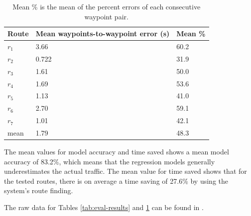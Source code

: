 \begin{table}[H]
	\centering
	\begin{tabular}{lll}
		\textbf{Route} & \textbf{Mean waypoints-to-waypoint error (s)}    & \textbf{Mean \%} \\ \hline
		$r_1$          & 3.66                                             & 60.2 \\
		$r_2$          & 0.722                                            & 31.9 \\
		$r_3$          & 1.61                                             & 50.0 \\
		$r_4$          & 1.69                                             & 53.6 \\
		$r_5$          & 1.13                                             & 41.0 \\
		$r_6$          & 2.70                                             & 59.1 \\
		$r_7$          & 1.01                                             & 42.1 \\ \hline
		mean           & 1.79                                             & 48.3
	\end{tabular}
	\caption{Mean \% is the mean of the percent errors of each consecutive waypoint pair.}
	\label{tab:eval-results-2}
\end{table}

The mean values for model accuracy and time saved shows a mean model accuracy of 83.2\%, which means that the regression models generally underestimates the actual traffic. The mean value for time saved shows that for the tested routes, there is on average a time saving of 27.6\% by using the system's route finding.

The raw data for Tables \ref{tab:eval-results} and \ref{tab:eval-results-2} can be found in .